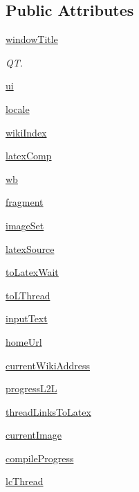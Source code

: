 \subsection*{\-Public \-Attributes}
\begin{DoxyCompactItemize}
\item 
\hyperlink{classuicilibris_1_1w2mMainWindow_a7ba2f6374f9d3d52acf7f99f8eac18d1}{window\-Title}
\begin{DoxyCompactList}\small\item\em \-Q\-T. \end{DoxyCompactList}\item 
\hyperlink{classuicilibris_1_1w2mMainWindow_a73782bac2df26e751c3708d1d4bf91ea}{ui}
\item 
\hyperlink{classuicilibris_1_1w2mMainWindow_a8919c7e4aa2248b775d19d4ee06e4804}{locale}
\item 
\hyperlink{classuicilibris_1_1w2mMainWindow_a33b1085f838c6856e90a6c84913bf524}{wiki\-Index}
\item 
\hyperlink{classuicilibris_1_1w2mMainWindow_ac0ae42df26bed5f2fa3fc528e45ed509}{latex\-Comp}
\item 
\hyperlink{classuicilibris_1_1w2mMainWindow_a68829ffe68e143cc8b97935532cf61ba}{wb}
\item 
\hyperlink{classuicilibris_1_1w2mMainWindow_afb4f580f333201e8a365c655f2d4007d}{fragment}
\item 
\hyperlink{classuicilibris_1_1w2mMainWindow_aea918e60f8f75f52253e51e3d9be7541}{image\-Set}
\item 
\hyperlink{classuicilibris_1_1w2mMainWindow_ada151c14c9130c23e785400ed4a928a0}{latex\-Source}
\item 
\hyperlink{classuicilibris_1_1w2mMainWindow_ac67489763eaf17eae4ce5f1cd0de6b89}{to\-Latex\-Wait}
\item 
\hyperlink{classuicilibris_1_1w2mMainWindow_af19955a3bdc866a94bead13aa3afa0d0}{to\-L\-Thread}
\item 
\hyperlink{classuicilibris_1_1w2mMainWindow_a0f89ac428c7513bf0ec4dbf0a3ecb5d1}{input\-Text}
\item 
\hyperlink{classuicilibris_1_1w2mMainWindow_a2bc2b98beaf3e58c75d0d498d04a633a}{home\-Url}
\item 
\hyperlink{classuicilibris_1_1w2mMainWindow_a2f24f6bdda0fbbca6e1db32c7d98340e}{current\-Wiki\-Address}
\item 
\hyperlink{classuicilibris_1_1w2mMainWindow_a4efb76de4a069dcd039f109ef4919ef1}{progress\-L2\-L}
\item 
\hyperlink{classuicilibris_1_1w2mMainWindow_a47c2a15391bed6ec03cde163f38e6c5b}{thread\-Links\-To\-Latex}
\item 
\hyperlink{classuicilibris_1_1w2mMainWindow_afe2ccbbc20677f9ddd2d2fa77caeb806}{current\-Image}
\item 
\hyperlink{classuicilibris_1_1w2mMainWindow_a8c8646a28acac6615945567f1fa46c69}{compile\-Progress}
\item 
\hyperlink{classuicilibris_1_1w2mMainWindow_a7b0a865015bd2ba10295f6005cea9d38}{lc\-Thread}
\end{DoxyCompactItemize}


